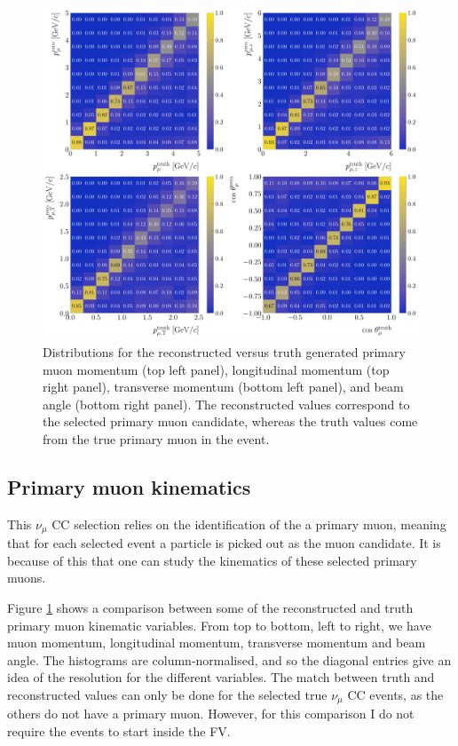 \begin{figure}[t]
    \centering
    \includegraphics[width=.99\linewidth]{Images/GAr_selection/numuCC_muon_kinematic_comp.pdf}
    \caption[Distributions for the reconstructed versus truth primary muon momentum, longitudinal momentum, transverse momentum, and angle.]{Distributions for the reconstructed versus truth generated primary muon momentum (top left panel), longitudinal momentum (top right panel), transverse momentum (bottom left panel), and beam angle (bottom right panel). The reconstructed values correspond to the selected primary muon candidate, whereas the truth values come from the true primary muon in the event.}
    \label{fig:numuCC_muon_kinematic_comp}
\end{figure}

\subsection{Primary muon kinematics}

This $\nu_{\mu}$ CC selection relies on the identification of the a primary muon, meaning that for each selected event a particle is picked out as the muon candidate. It is because of this that one can study the kinematics of these selected primary muons.

Figure \ref{fig:numuCC_muon_kinematic_comp} shows a comparison between some of the reconstructed and truth primary muon kinematic variables. From top to bottom, left to right, we have muon momentum, longitudinal momentum, transverse momentum and beam angle. The histograms are column-normalised, and so the diagonal entries give an idea of the resolution for the different variables. The match between truth and reconstructed values can only be done for the selected true $\nu_{\mu}$ CC events, as the others do not have a primary muon. However, for this comparison I do not require the events to start inside the FV.

